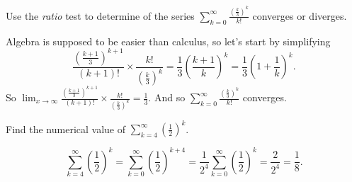 \documentclass[12pt,fleqn]{exam}
\begin{document}
\begin{questions}
\question [1] Use the \emph{ratio} test to determine of the series $\sum_{k=0}^\infty \frac{  \left(\frac{k}{3} \right)^k }{ k!}$ converges or diverges.
\begin{solution}%
Algebra is supposed to be easier than calculus, so let's start by simplifying
\begin{equation*}
\frac{ (\frac{k+1}{3})^{k+1}}{(k+1)!} \times \frac{k!}{ \left(\frac{k}{3} \right)^k} = 
\frac{1}{3} (\frac{k+1}{k})^k = \frac{1}{3}  \left(1 + \frac{1}{k} \right)^k.
\end{equation*}
So $\displaystyle  \lim_{x \to \infty} \frac{ (\frac{k+1}{3})^{k+1}}{(k+1)!} \times \frac{k!}{ (\frac{k}{3})^k} = \frac{1}{3}$.
And so $\displaystyle \sum_{k=0}^\infty \frac{  \left(\frac{k}{3} \right)^k }{ k!}$ converges. 
\end{solution}



\question [5] Find the numerical value of  \(\displaystyle \sum_{k=4}^\infty \left(\frac{1}{2} \right)^k \).
\begin{solution}[2.5in]
\[
 \sum_{k=4}^\infty \left(\frac{1}{2} \right)^k = \sum_{k=0}^\infty \left(\frac{1}{2} \right)^{k + 4}
  = \frac{1}{2^4} \sum_{k=0}^\infty \left(\frac{1}{2} \right)^{k} = \frac{2}{2^4} = \frac{1}{8}.
\]
\end{solution}



\end{questions}
\end{document}
